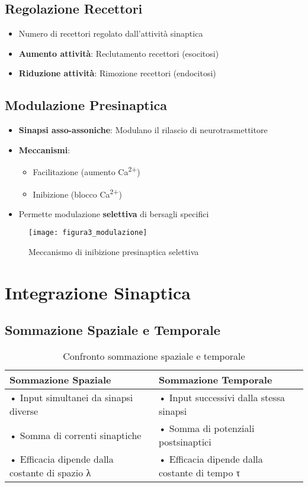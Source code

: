 \documentclass{article}
\begin{document}
\subsection{Regolazione Recettori}
\begin{itemize}
\item Numero di recettori regolato dall'attività sinaptica
\item \textbf{Aumento attività}: Reclutamento recettori (esocitosi)
\item \textbf{Riduzione attività}: Rimozione recettori (endocitosi)
\end{itemize}

\subsection{Modulazione Presinaptica}
\begin{itemize}
\item \textbf{Sinapsi asso-assoniche}: Modulano il rilascio di neurotrasmettitore
\item \textbf{Meccanismi}:
  \begin{itemize}
  \item Facilitazione (aumento Ca\textsuperscript{2+})
  \item Inibizione (blocco Ca\textsuperscript{2+})
  \end{itemize}
\item Permette modulazione \textbf{selettiva} di bersagli specifici
\end{itemize}

\begin{figure}[h]
\centering
\texttt{[image: figura3\_modulazione]}
\caption{Meccanismo di inibizione presinaptica selettiva}
\label{fig:modulazione}
\end{figure}

\section{Integrazione Sinaptica}
\subsection{Sommazione Spaziale e Temporale}
\begin{table}[h]
\centering
\caption{Confronto sommazione spaziale e temporale}
\begin{tabular}{p{6cm}p{6cm}}
\toprule
\textbf{Sommazione Spaziale} & \textbf{Sommazione Temporale} \\
\midrule
• Input simultanei da sinapsi diverse & • Input successivi dalla stessa sinapsi \\
• Somma di correnti sinaptiche & • Somma di potenziali postsinaptici \\
• Efficacia dipende dalla costante di spazio λ & • Efficacia dipende dalla costante di tempo τ \\
\bottomrule
\end{tabular}
\label{tab:sommazione}
\end{table}
\end{document}
